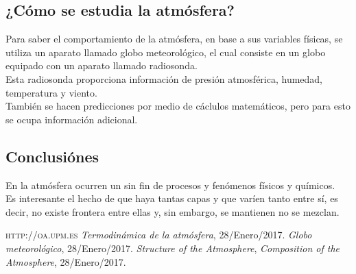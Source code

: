 \documentclass[a4paper]{article}
\begin{document}
\subsection*{¿Cómo se estudia la atmósfera?}
Para saber el comportamiento de la atmósfera, en base a sus variables físicas, se utiliza un aparato llamado globo meteorológico, el cual consiste en un globo equipado con un aparato llamado radiosonda. \\ Esta radiosonda proporciona información de presión atmosférica, humedad, temperatura y viento. \\
También se hacen predicciones por medio de cáclulos matemáticos, pero para esto se ocupa información adicional.
\vspace{1cm}
\subsection*{Conclusiónes}
En la atmósfera ocurren un sin fin de procesos y fenómenos físicos y químicos. \\
Es interesante el hecho de que haya tantas capas y que varíen tanto entre sí, es decir, no existe frontera entre ellas y, sin embargo, se mantienen no se mezclan.

\vspace{1.8cm}

\begin{thebibliography}{9}
 \textsc{http://oa.upm.es} \textit{Termodinámica de la atmósfera}, 28/Enero/2017.
 \textit{Globo meteorológico}, 28/Enero/2017.
 \textit{Structure of the Atmosphere}, \textit{Composition of the Atmosphere}, 28/Enero/2017. 
\end{thebibliography}
\end{document}
